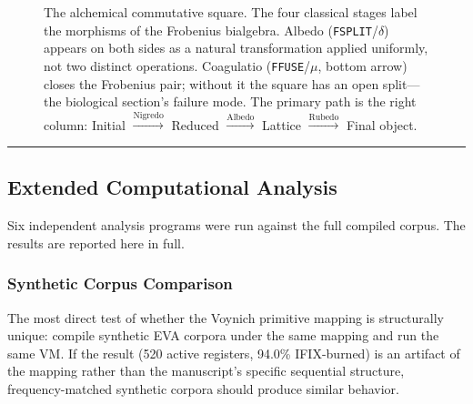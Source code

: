 \documentclass[12pt,a4paper]{article}
\begin{document}
\begin{figure}[htbp]
\centering
{}
\caption{The alchemical commutative square. The four classical stages label the morphisms of the Frobenius bialgebra. Albedo (\texttt{FSPLIT}/$\delta$) appears on both sides as a natural transformation applied uniformly, not two distinct operations. Coagulatio (\texttt{FFUSE}/$\mu$, bottom arrow) closes the Frobenius pair; without it the square has an open split---the biological section's failure mode. The primary path is the right column: Initial $\xrightarrow{\text{Nigredo}}$ Reduced $\xrightarrow{\text{Albedo}}$ Lattice $\xrightarrow{\text{Rubedo}}$ Final object.}
\label{fig:alchemical-square}
\end{figure}

\begin{center}
\rule{0.5\textwidth}{0.4pt}
\end{center}

\subsection{Extended Computational Analysis}

Six independent analysis programs were run against the full compiled corpus. The results are reported here in full.

\subsubsection{Synthetic Corpus Comparison}

The most direct test of whether the Voynich primitive mapping is structurally unique: compile synthetic EVA corpora under the same mapping and run the same VM. If the result (520 active registers, 94.0\% IFIX-burned) is an artifact of the mapping rather than the manuscript's specific sequential structure, frequency-matched synthetic corpora should produce similar behavior.
\end{document}

